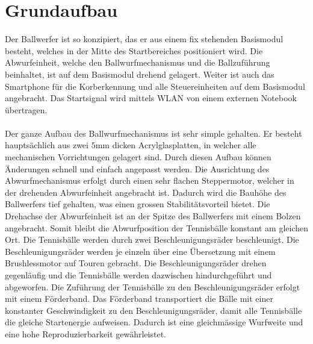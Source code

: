 \section{Grundaufbau}
    Der Ballwerfer ist so konzipiert, das er aus einem fix stehenden Basismodul besteht, 
    welches in der Mitte des Startbereiches positioniert wird. Die Abwurfeinheit, welche 
    den Ballwurfmechanismus und die Ballzuführung beinhaltet, ist auf dem Basismodul 
    drehend gelagert. Weiter ist auch das Smartphone für die Korberkennung und alle 
    Steuereinheiten auf dem Basismodul angebracht. Das Startsignal wird mittels WLAN 
    von einem externen Notebook übertragen.\\
    \\
    Der ganze Aufbau des Ballwurfmechanismus ist sehr simple gehalten. Er besteht 
    hauptsächlich aus zwei $5\si{\milli\meter}$ dicken Acrylglasplatten, in welcher alle mechanischen 
    Vorrichtungen gelagert sind. Durch diesen Aufbau können Änderungen schnell und 
    einfach angepasst werden. Die Ausrichtung des Abwurfmechanismus erfolgt durch 
    einen sehr flachen Steppermotor, welcher in der drehenden Abwurfeinheit angebracht 
    ist. Dadurch wird die Bauhöhe des Ballwerfers tief gehalten, was einen grossen 
    Stabilitätsvorteil bietet. Die Drehachse der Abwurfeinheit ist an der Spitze des 
    Ballwerfers mit einem Bolzen angebracht. Somit bleibt die Abwurfposition der 
    Tennisbälle konstant am gleichen Ort. Die Tennisbälle werden durch zwei 
    Beschleunigungsräder beschleunigt. Die Beschleunigungsräder werden je einzeln 
    über eine Übersetzung mit einem Brushlessmotor auf Touren gebracht. Die Beschleunigungsräder 
    drehen gegenläufig und die Tennisbälle werden dazwischen hindurchgeführt und 
    abgeworfen. Die Zuführung der Tennisbälle zu den Beschleunigungsräder erfolgt mit 
    einem Förderband. Das Förderband transportiert die Bälle mit einer 
    konstanter Geschwindigkeit zu den Beschleunigungsräder, damit alle Tennisbälle die 
    gleiche Startenergie aufweisen. Dadurch ist eine gleichmässige Wurfweite und eine 
    hohe Reproduzierbarkeit gewährleistet.
    
    
